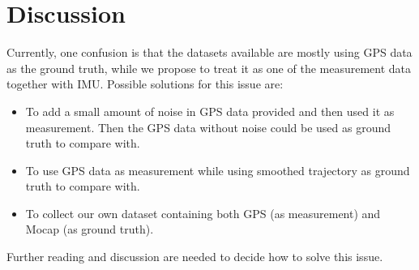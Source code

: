 \documentclass{IEEEtran}
\begin{document}
\section{Discussion}
Currently, one confusion is that the datasets available are mostly using GPS data as the ground truth, while we propose to treat it as one of the measurement data together with IMU. Possible solutions for this issue are:
\begin{itemize}
    \item To add a small amount of noise in GPS data provided and then used it as measurement. Then the GPS data without noise could be used as ground truth to compare with.
    \item To use GPS data as measurement while using smoothed trajectory as ground truth to compare with.
    \item To collect our own dataset containing both GPS (as measurement) and Mocap (as ground truth).
\end{itemize}
Further reading and discussion are needed to decide how to solve this issue.
%


%
\end{document}
